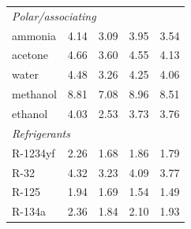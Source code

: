 \begin{table}[H]
\begin{tabular}{lrrrr}
\multicolumn{5}{l}{\itshape Polar/associating}\\
\quad ammonia & 4.14 & 3.09 & 3.95 & 3.54 \\
\quad acetone & 4.66 & 3.60 & 4.55 & 4.13 \\
\quad water & 4.48 & 3.26 & 4.25 & 4.06 \\
\quad methanol & 8.81 & 7.08 & 8.96 & 8.51 \\
\quad ethanol & 4.03 & 2.53 & 3.73 & 3.76 \\
\multicolumn{5}{l}{\itshape Refrigerants}\\
\quad R-1234yf & 2.26 & 1.68 & 1.86 & 1.79 \\
\quad R-32 & 4.32 & 3.23 & 4.09 & 3.77 \\
\quad R-125 & 1.94 & 1.69 & 1.54 & 1.49 \\
\quad R-134a & 2.36 & 1.84 & 2.10 & 1.93 \\
\bottomrule
\end{tabular}
\end{table}
